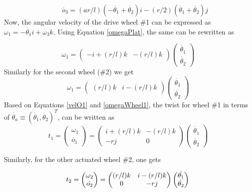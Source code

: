 \begin{equation}
\label{velPlat}
 \quad \quad \dot{o_3}={(a r/l)(-\dot{\theta_1}+\dot{\theta_2})}i -(r/2)( \dot{\theta_1}+ \dot{\theta_2})j
\end{equation}
Now, the angular velocity of the drive wheel \#1 can be expressed as ${\omega_1}=-\dot{\theta_1}i+\omega_3k$. Using Equation \ref{omegaPlat}, the same can be rewritten as 

\begin{equation}
\label{omegaWheel1}
{\omega_1}=\begin{pmatrix}
-i+(r/l)k & -(r/l)k
\end{pmatrix}
\begin{pmatrix}
\dot{\theta_1}\\\dot{\theta_2}
\end{pmatrix}
\end{equation}
Similarly for the second wheel (\#2) we get
\begin{equation}
\label{omegaWheel2}
{\omega_1}=\begin{pmatrix}
(r/l)k & i-(r/l)k
\end{pmatrix}
\begin{pmatrix}
\dot{\theta_1}\\\dot{\theta_2}
\end{pmatrix}
\end{equation}
Based on  Equations \ref{velO1} and \ref{omegaWheel1}, the twist for wheel \#1 in terms of $\dot{\theta_a}\equiv (\dot{\theta_1},\dot{\theta_2})^T$, can be written as 
\begin{equation}
\label{twist1}
t_1=\begin{pmatrix}
\omega_1\\\dot{o_1}
\end{pmatrix}=
\begin{pmatrix}
i+(r/l)k & -(r/l)k\\- rj & 0
\end{pmatrix}
\begin{pmatrix}
\dot{\theta_1}\\\dot{\theta_2}
\end{pmatrix}
\end{equation}

Similarly, for the other actuated wheel \#2, one gets

\begin{equation}
\label{twist2}
t_2=\begin{pmatrix}
\omega_2\\\dot{o_2}
\end{pmatrix}=
		\begin{pmatrix}
		(r/l)k & i-(r/l)k\\
		  0 & -rj
		\end{pmatrix}
		\begin{pmatrix}
		\dot{\theta_1}\\\dot{\theta_2}
		\end{pmatrix}\\
		\end{equation}

